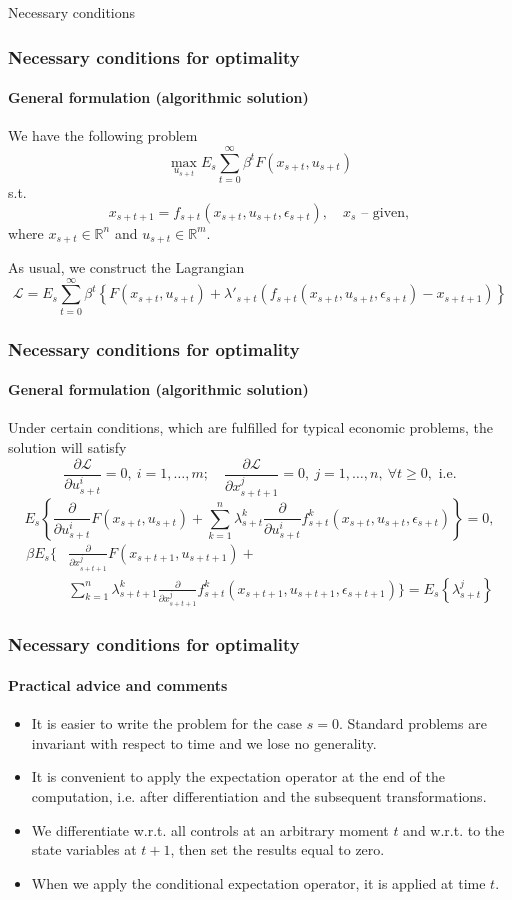 \documentclass[10pt]{beamer}
\theoremstyle{definition}
\begin{document}
\begin{section}{Necessary conditions}\label{sec:NCs}

\begin{frame}
\frametitle{Necessary conditions for optimality}\framesubtitle{General formulation
(algorithmic solution)} We have the following problem
$$\max_{u_{s+t}}E_s\sum_{t=0}^\infty \beta^t F(x_{s+t},u_{s+t})$$ s.t.
$$x_{s+t+1}=f_{s+t}(x_{s+t},u_{s+t},\epsilon_{s+t}),\quad x_s\textrm{ --
given},$$ where $x_{s+t}\in \mathbb{R}^n$ and $u_{s+t}\in \mathbb{R}^m$.

As usual, we construct the Lagrangian $$\mathcal{L}=E_s\sum_{t=0}^\infty \beta^t
\left\{ F(x_{s+t},u_{s+t}) + \lambda'_{s+t}
(f_{s+t}(x_{s+t},u_{s+t},\epsilon_{s+t})-x_{s+t+1}) \right\}$$

\end{frame}


\begin{frame} \frametitle{Necessary conditions for optimality}\framesubtitle{General formulation
(algorithmic solution)} Under certain conditions, which are fulfilled for typical economic problems, the solution will satisfy 
$$\frac{\partial \mathcal{L}}{\partial u_{s+t}^i}=0,~i=1,\ldots,m; \quad \frac{\partial \mathcal{L}}{\partial x_{s+t+1}^j}=0,~j=1,\ldots,n,~\forall t \geq 0,\textrm{ i.e.} $$
$$E_s
\left\{ \frac{\partial}{\partial u_{s+t}^i}F(x_{s+t},u_{s+t}) + \sum_{k=1}^n \lambda^k_{s+t}
\frac{\partial}{\partial u_{s+t}^i}f^k_{s+t}(x_{s+t},u_{s+t},\epsilon_{s+t}) \right\}=0,$$
\begin{equation*}
    \begin{split}
\beta E_s
\Biggl\{ & \frac{\partial}{\partial x_{s+t+1}^j} F(x_{s+t+1},u_{s+t+1}) + \\ &  \sum_{k=1}^n \lambda^k_{s+t+1}
\frac{\partial}{\partial x_{s+t+1}^j}f^k_{s+t}(x_{s+t+1},u_{s+t+1},\epsilon_{s+t+1}) \Biggr\} =  E_s
\left\{ \lambda_{s+t}^j \right\}
    \end{split}
\end{equation*}
\end{frame}



\begin{frame}
\frametitle{Necessary conditions for optimality}
\framesubtitle{Practical advice and comments}
\begin{itemize}\itemsep1em
\item It is easier to write the problem for the case $ s=0 $. Standard problems are invariant with respect to time and we lose no generality. 
\item It is convenient to apply the expectation operator at the end of the computation, i.e. after differentiation and the subsequent transformations.
\item We differentiate w.r.t. all controls at an arbitrary moment $ t $ and w.r.t. to the state variables at $ t+1 $, then set the results equal to zero.
\item When we apply the conditional expectation operator, it is applied at time $ t $.
\end{itemize}
\end{frame}




\end{section}
\end{document}
